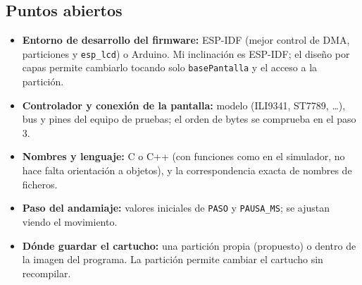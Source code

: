 \subsection{Puntos abiertos}
\label{sec:F6I02Abiertos}

\begin{itemize}
	\item \textbf{Entorno de desarrollo del firmware:} ESP-IDF (mejor control de DMA, particiones y \texttt{esp\_lcd}) o Arduino. Mi inclinación es ESP-IDF; el diseño por capas permite cambiarlo tocando solo \texttt{basePantalla} y el acceso a la partición.
	\item \textbf{Controlador y conexión de la pantalla:} modelo (ILI9341, ST7789, \ldots), bus y pines del equipo de pruebas; el orden de bytes se comprueba en el paso 3.
	\item \textbf{Nombres y lenguaje:} C o C++ (con funciones como en el simulador, no hace falta orientación a objetos), y la correspondencia exacta de nombres de ficheros.
	\item \textbf{Paso del andamiaje:} valores iniciales de \texttt{PASO} y \texttt{PAUSA\_MS}; se ajustan viendo el movimiento.
	\item \textbf{Dónde guardar el cartucho:} una partición propia (propuesto) o dentro de la imagen del programa. La partición permite cambiar el cartucho sin recompilar.
\end{itemize}

\clearpage